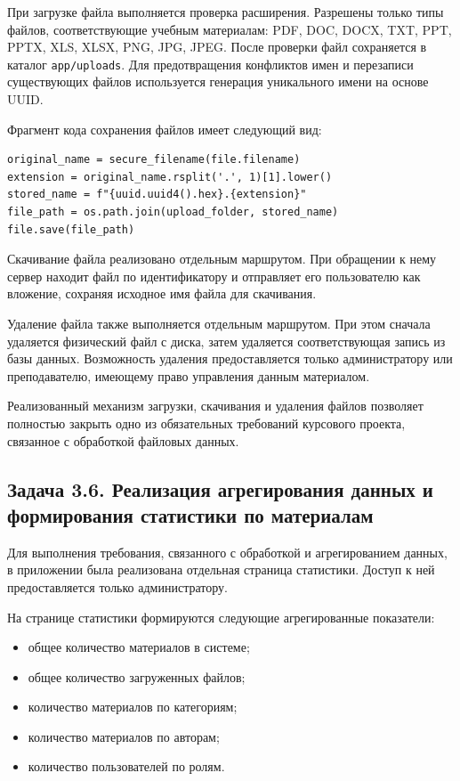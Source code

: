 \documentclass[14pt,a4paper]{extarticle}
\begin{document}
При загрузке файла выполняется проверка расширения. Разрешены только типы файлов, соответствующие учебным материалам: PDF, DOC, DOCX, TXT, PPT, PPTX, XLS, XLSX, PNG, JPG, JPEG. После проверки файл сохраняется в каталог \texttt{app/uploads}. Для предотвращения конфликтов имен и перезаписи существующих файлов используется генерация уникального имени на основе UUID.

Фрагмент кода сохранения файлов имеет следующий вид:

\begin{lstlisting}
original_name = secure_filename(file.filename)
extension = original_name.rsplit('.', 1)[1].lower()
stored_name = f"{uuid.uuid4().hex}.{extension}"
file_path = os.path.join(upload_folder, stored_name)
file.save(file_path)
\end{lstlisting}

Скачивание файла реализовано отдельным маршрутом. При обращении к нему сервер находит файл по идентификатору и отправляет его пользователю как вложение, сохраняя исходное имя файла для скачивания.

Удаление файла также выполняется отдельным маршрутом. При этом сначала удаляется физический файл с диска, затем удаляется соответствующая запись из базы данных. Возможность удаления предоставляется только администратору или преподавателю, имеющему право управления данным материалом.

Реализованный механизм загрузки, скачивания и удаления файлов позволяет полностью закрыть одно из обязательных требований курсового проекта, связанное с обработкой файловых данных.

\subsection{Задача 3.6. Реализация агрегирования данных и формирования статистики по материалам}

Для выполнения требования, связанного с обработкой и агрегированием данных, в приложении была реализована отдельная страница статистики. Доступ к ней предоставляется только администратору.

На странице статистики формируются следующие агрегированные показатели:

\begin{itemize}[leftmargin=1.25cm]
    \item общее количество материалов в системе;
    \item общее количество загруженных файлов;
    \item количество материалов по категориям;
    \item количество материалов по авторам;
    \item количество пользователей по ролям.
\end{itemize}
\end{document}
